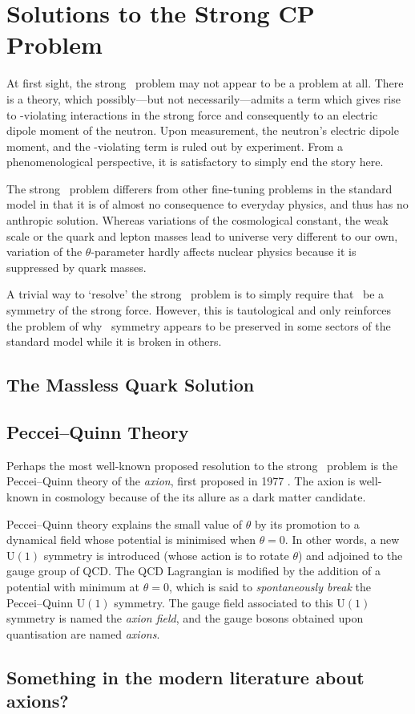 \chapter{Solutions to the Strong CP Problem}

At first sight, the strong \CP\ problem may not appear to be a problem at all.
There is a theory, which possibly---but not necessarily---admits a term which gives rise to \CP-violating interactions in the strong force and consequently to an electric dipole moment of the neutron.
Upon measurement, the neutron's electric dipole moment, and the \CP-violating term is ruled out by experiment.
From a phenomenological perspective, it is satisfactory to simply end the story here.

The strong \CP\ problem differers from other fine-tuning problems in the standard model  in that it is of almost no consequence to everyday physics, and thus has no anthropic solution.
Whereas variations of the cosmological constant, the weak scale or the quark and lepton masses lead to universe very different to our own, variation of the $\theta$-parameter hardly affects nuclear physics because it is suppressed by quark masses.

A trivial way to `resolve' the strong \CP\ problem is to simply require that \CP\ be a symmetry of the strong force.
However, this is tautological and only reinforces the problem of why \CP\ symmetry appears to be preserved in some sectors of the standard model while it is broken in others.

\section{The Massless Quark Solution}

\section{Peccei--Quinn Theory}

Perhaps the most well-known proposed resolution to the strong \CP\ problem is the Peccei--Quinn theory of the \emph{axion}, first proposed in 1977 \cite{PecceiQuinn_1977}.
The axion is well-known in cosmology because of the its allure as a dark matter candidate.

Peccei--Quinn theory explains the small value of $\theta$ by its promotion to a dynamical field whose potential is minimised when $\theta = 0$.
In other words, a new $\mathrm{U}(1)$ symmetry is introduced (whose action is to rotate $\theta$) and adjoined to the gauge group of QCD.
The QCD Lagrangian is modified by the addition of a potential with minimum at $\theta = 0$, which is said to \emph{spontaneously break} the Peccei--Quinn $\mathrm{U}(1)$ symmetry.
The gauge field associated to this $\mathrm{U}(1)$ symmetry is named the \emph{axion field}, and the gauge bosons obtained upon quantisation are named \emph{axions}.


\section{Something in the modern literature about axions?}